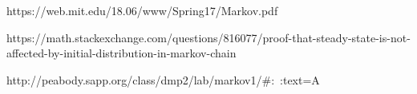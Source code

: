 https://web.mit.edu/18.06/www/Spring17/Markov.pdf

https://math.stackexchange.com/questions/816077/proof-that-steady-state-is-not-affected-by-initial-distribution-in-markov-chain

http://peabody.sapp.org/class/dmp2/lab/markov1/#:~:text=A%